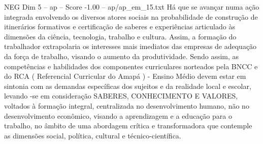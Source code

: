 \begin{textsample}{NEG Dim 5 – ap – Score -1.00 – ap/ap\_em\_15.txt}
Há que se avançar numa ação integrada envolvendo os diversos atores sociais na probabilidade de construção de itinerários formativos e certificação de saberes e experiências articulado às dimensões da ciência, tecnologia, trabalho e cultura.
Assim, a formação do trabalhador extrapolaria os interesses mais imediatos das empresas de adequação da força de trabalho, visando o aumento da produtividade.
Sendo assim, as competências e habilidades dos componentes curriculares norteados pela BNCC e do RCA ( Referencial Curricular do Amapá ) - Ensino Médio devem estar em sintonia com as demandas específicas dos sujeitos e da realidade local e escolar, levando -se em consideração SABERES, CONHECIMENTO E VALORES, voltados à formação integral, centralizada no desenvolvimento humano, não no desenvolvimento econômico, visando a aprendizagem e a educação para o trabalho, no âmbito de uma abordagem crítica e transformadora que contemple as dimensões social, política, cultural e técnico-científica.

\end{textsample}
